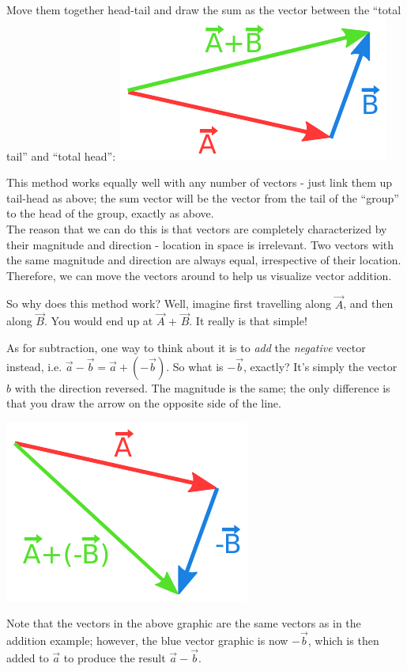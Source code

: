 \documentclass[12pt,a4paper]{report}
\begin{document}
Move them together head-tail and draw the sum as the vector between the ``total tail'' and ``total head'':
\includegraphics[scale=0.9]{Graphics/vectors/adding2}

This method works equally well with any number of vectors - just link them up tail-head as above; the sum vector will be the vector from the tail of the ``group'' to the head of the group, exactly as above.\\
The reason that we can do this is that vectors are completely characterized by their magnitude and direction - location in space is irrelevant. Two vectors with the same magnitude and direction are always equal, irrespective of their location. Therefore, we can move the vectors around to help us visualize vector addition.

So why does this method work? Well, imagine first travelling along $\vec{A}$, and then along $\vec{B}$. You would end up at $\vec{A}$ + $\vec{B}$. It really is that simple!

As for subtraction, one way to think about it is to \emph{add} the \emph{negative} vector instead, i.e. $\vec{a} - \vec{b} = \vec{a} + (-\vec{b})$. So what is $-\vec{b}$, exactly? It's simply the vector $b$ with the direction reversed. The magnitude is the same; the only difference is that you draw the arrow on the opposite side of the line.

\includegraphics[scale=0.9]{Graphics/vectors/vectorsub}

Note that the vectors in the above graphic are the same vectors as in the addition example; however, the blue vector graphic is now $-\vec{b}$, which is then added to $\vec{a}$ to produce the result $\vec{a} - \vec{b}$.
\end{document}
